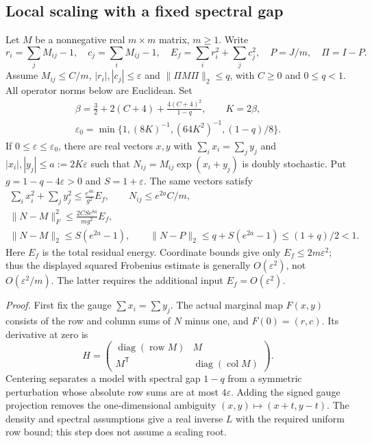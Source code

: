 \documentclass[11pt]{article}
\begin{document}
\subsection*{Local scaling with a fixed spectral gap}
Let $M$ be a nonnegative real $m\times m$ matrix, $m\ge1$. Write
\[
 r_i=\sum_jM_{ij}-1,\quad c_j=\sum_iM_{ij}-1,\quad
 E_f=\sum_i r_i^2+\sum_j c_j^2,\quad P=J/m,\quad \Pi=I-P.
\]
Assume $M_{ij}\le C/m$, $|r_i|,|c_j|\le\varepsilon$ and
$\|\Pi M\Pi\|_2\le q$, with $C\ge0$ and $0\le q<1$. All operator norms below are Euclidean. Set
\[
 \begin{gathered}
 \beta=\tfrac32+2(C+4)+\frac{4(C+4)^2}{1-q},\qquad K=2\beta,\\
 \varepsilon_0=\min\{1,(8K)^{-1},(64K^2)^{-1},(1-q)/8\}.
 \end{gathered}
\]
If $0\le\varepsilon\le\varepsilon_0$, there are real vectors $x,y$ with
$\sum_i x_i=\sum_j y_j$ and $|x_i|,|y_j|\le a:=2K\varepsilon$ such that
$N_{ij}=M_{ij}\exp(x_i+y_j)$ is doubly stochastic. Put $g=1-q-4\varepsilon>0$ and $S=1+\varepsilon$. The same vectors satisfy
\[
 \begin{gathered}
 \sum_i x_i^2+\sum_j y_j^2\le \frac{e^{4a}}{g^2}E_f,
 \qquad N_{ij}\le e^{2a}C/m,\\
 \|N-M\|_F^2\le\frac{2CS e^{8a}}{m g^2}E_f,\\
 \|N-M\|_2\le S(e^{2a}-1),\qquad
 \|N-P\|_2\le q+S(e^{2a}-1)\le(1+q)/2<1.
 \end{gathered}
\]
Here $E_f$ is the total residual energy. Coordinate bounds give only $E_f\le2m\varepsilon^2$; thus the displayed squared Frobenius estimate is generally $O(\varepsilon^2)$, not $O(\varepsilon^2/m)$. The latter requires the additional input $E_f=O(\varepsilon^2)$.

\emph{Proof.} First fix the gauge $\sum x_i=\sum y_j$. The actual marginal map $F(x,y)$ consists of the row and column sums of $N$ minus one, and $F(0)=(r,c)$. Its derivative at zero is
\[
 H=\begin{pmatrix}\operatorname{diag}(\operatorname{row}M)&M\\
 M^{\mathsf T}&\operatorname{diag}(\operatorname{col}M)\end{pmatrix}.
\]
Centering separates a model with spectral gap $1-q$ from a symmetric perturbation whose absolute row sums are at most $4\varepsilon$. Adding the signed gauge projection removes the one-dimensional ambiguity $(x,y)\mapsto(x+t,y-t)$. The density and spectral assumptions give a real inverse $L$ with the required uniform row bound; this step does not assume a scaling root.
\end{document}
